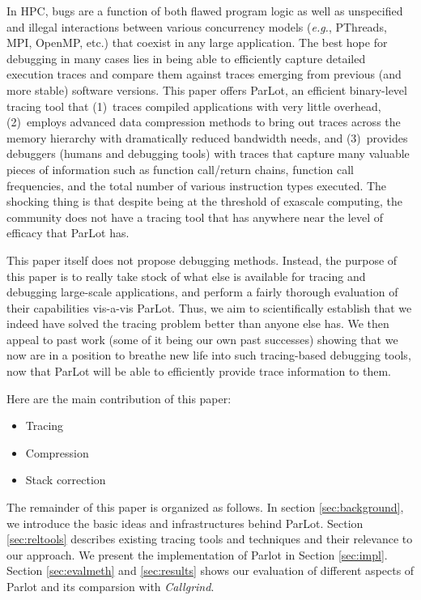 In HPC, bugs are a function of both flawed program logic as well as unspecified
and illegal interactions between various concurrency models ({\em e.g.}, PThreads,
MPI, OpenMP, etc.) that coexist in any
large application.
%
The best hope for debugging in many cases
lies in being able to efficiently capture detailed execution
traces and compare them against traces emerging from previous (and more stable) 
software versions.
%
This paper offers ParLot, an efficient binary-level tracing tool that 
(1)~traces compiled applications with very little overhead, (2)~employs
advanced data compression methods to bring out traces across the memory
hierarchy with dramatically reduced bandwidth needs, and (3)~provides debuggers
(humans and debugging tools) with traces that capture many valuable pieces of
information such as function call/return chains, function call frequencies, and
the total number of various instruction types executed.
%
The shocking thing is that despite being at the threshold of exascale computing,
the community does not have a tracing tool that has anywhere near the level
of efficacy that ParLot has.


This paper itself does not propose debugging methods.
%
Instead, the purpose of this paper is to really take stock of what else is
available for tracing and debugging large-scale applications, and perform 
a fairly thorough evaluation of their capabilities vis-a-vis ParLot.
%
Thus, we aim to scientifically establish that we indeed have solved the
tracing problem better than anyone else has.
%
We then appeal to past work (some of it being our own past successes) showing that we now are in
a position to breathe new life into such tracing-based debugging tools, now that
ParLot will be able to efficiently provide trace information to them.

Here are the main contribution of this paper:
\begin{itemize}
\item Tracing
\item Compression
\item Stack correction
\end{itemize}

The remainder of this paper is organized as follows. In section
\ref{sec:background}, we introduce the basic ideas and infrastructures behind ParLot. Section \ref{sec:reltools} describes existing tracing tools and techniques and their relevance
to our approach. We present the implementation of Parlot in Section \ref{sec:impl}. Section \ref{sec:evalmeth} and \ref{sec:results} shows our evaluation of different aspects of Parlot and its comparsion with \textit{Callgrind}.
